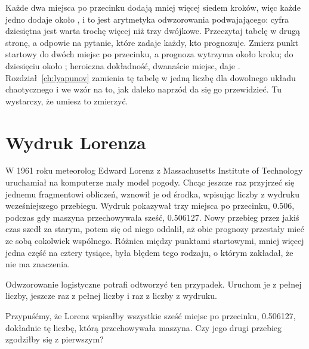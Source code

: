 
\noindent
Każde dwa miejsca po przecinku dodają mniej więcej siedem kroków, więc
każde jedno dodaje około , i to jest arytmetyka
odwzorowania podwajającego: cyfra dziesiętna jest warta trochę więcej niż
trzy dwójkowe. Przeczytaj tabelę w drugą stronę, a odpowie na pytanie, które
zadaje każdy, kto prognozuje. Zmierz punkt startowy do dwóch miejsc po
przecinku, a prognoza wytrzyma około  kroku; do
dziesięciu \dash{} około ; heroiczna dokładność,
dwanaście miejsc, daje . Rozdział~\ref{ch:lyapunov}
zamienia tę tabelę w jedną liczbę dla dowolnego układu chaotycznego i we
wzór na to, jak daleko naprzód da się go przewidzieć. Tu wystarczy, że
umiesz to zmierzyć.

\section{Wydruk Lorenza}
\label{sec:ch06-lorenz}

\noindent
W 1961 roku meteorolog Edward Lorenz z Massachusetts Institute of
Technology uruchamiał na komputerze mały model pogody. Chcąc jeszcze raz
przyjrzeć się jednemu fragmentowi obliczeń, wznowił je od środka, wpisując
liczby z wydruku wcześniejszego przebiegu. Wydruk pokazywał trzy miejsca po
przecinku, \num{0.506}, podczas gdy maszyna przechowywała sześć,
\num{0.506127}. Nowy przebieg przez jakiś czas szedł za starym, potem się od
niego oddalił, aż obie prognozy przestały mieć ze sobą cokolwiek wspólnego.
Różnica między punktami startowymi, mniej więcej jedna część na cztery
tysiące, była błędem tego rodzaju, o którym zakładał, że nie ma znaczenia.

Odwzorowanie logistyczne potrafi odtworzyć ten przypadek. Uruchom je z
pełnej liczby, jeszcze raz z pełnej liczby i raz z liczby z wydruku.

\begin{think}
Przypuśćmy, że Lorenz wpisałby wszystkie sześć miejsc po przecinku,
\num{0.506127}, dokładnie tę liczbę, którą przechowywała maszyna. Czy jego
drugi przebieg zgodziłby się z pierwszym?
\end{think}


